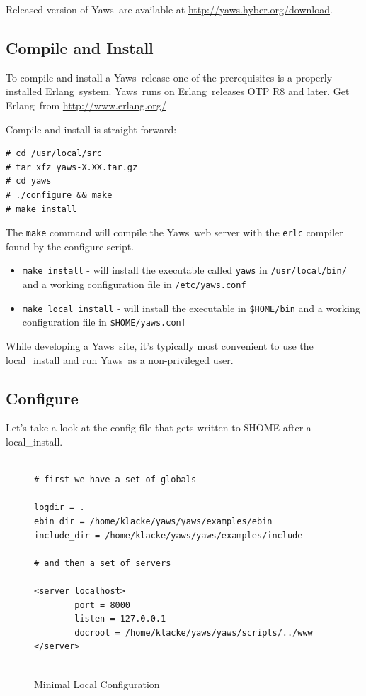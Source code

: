 \documentclass[11pt,oneside,english]{book}
\newcommand{\Erlang}            %
        {{\sc Erlang}}
\newcommand{\Yaws}            %
        {{\sc Yaws}}
\begin{document}
Released version of \Yaws\ are available at
\url{http://yaws.hyber.org/download}.

\subsection{Compile and Install}

To compile and install a \Yaws\  release
one of the prerequisites is a properly installed \Erlang\  system. \Yaws\
runs on \Erlang\  releases OTP R8 and later. Get \Erlang\  from
\url{http://www.erlang.org/}

Compile and install is straight forward:
\begin{verbatim}
# cd /usr/local/src
# tar xfz yaws-X.XX.tar.gz
# cd yaws
# ./configure && make
# make install
\end{verbatim}

The \verb+make+ command will compile the \Yaws\ web server with the
\verb+erlc+ compiler found by the configure script.

\begin{itemize}

\item  \verb+make install+ - will install the executable called
         \verb+yaws+ in \verb+/usr/local/bin/+ and a working
         configuration file in \verb+/etc/yaws.conf+

\item  \verb+make local_install+ - will install the executable in
         \verb+$HOME/bin+ and a working configuration file in
         \verb+$HOME/yaws.conf+

\end{itemize}

While developing a \Yaws\  site, it's typically most convenient to
use the local\_install and run \Yaws\  as a non-privileged user.


\subsection{Configure}
Let's take a look at the config file that gets written to \$HOME after
a local\_install.


\begin{figure}[h]
\begin{verbatim}

# first we have a set of globals

logdir = .
ebin_dir = /home/klacke/yaws/yaws/examples/ebin
include_dir = /home/klacke/yaws/yaws/examples/include

# and then a set of servers

<server localhost>
        port = 8000
        listen = 127.0.0.1
        docroot = /home/klacke/yaws/yaws/scripts/../www
</server>


\end{verbatim}
\caption{Minimal Local Configuration}
\end{figure}
\end{document}
